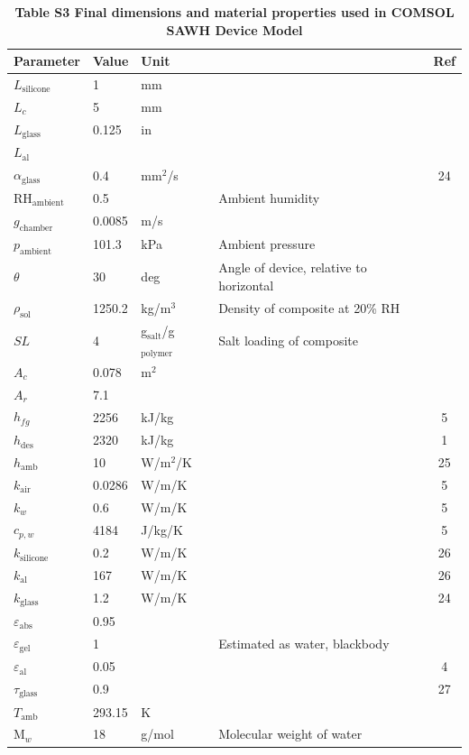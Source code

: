 \documentclass[11pt]{article}
\begin{document}
\begin{table}[!ht]
\centering
\caption*{\textbf{Table S3 Final dimensions and material properties used in COMSOL SAWH Device Model}}
\begin{tabular}{lllp{6cm}c}
\toprule
\textbf{Parameter} & \textbf{Value} & \textbf{Unit} & & \textbf{Ref}\\
\midrule
$L_{\mathrm{silicone}}$ & 1 & mm & & \\
$L_{c}$ & 5 & mm & & \\
$L_{\mathrm{glass}}$ & 0.125 & in & & \\
$L_{\mathrm{al}}$ & & & & \\
$\alpha_{\mathrm{glass}}$ & 0.4 & mm$^{2}$/s & & 24\\
RH$_{\mathrm{ambient}}$ & 0.5 & & Ambient humidity & \\
$g_{\mathrm{chamber}}$ & 0.0085 & m/s & & \\
$p_{\mathrm{ambient}}$ & 101.3 & kPa & Ambient pressure & \\
$\theta$ & 30 & deg & Angle of device, relative to horizontal & \\
$\rho_{\mathrm{sol}}$ & 1250.2 & kg/m$^{3}$ & Density of composite at 20\% RH & \\
$SL$ & 4 & g$_{\mathrm{salt}}$/g$_{\mathrm{polymer}}$ & Salt loading of composite & \\
$A_{c}$ & 0.078 & m$^{2}$ & & \\
$A_{r}$ & 7.1 & & & \\
$h_{fg}$ & 2256 & kJ/kg & & 5\\
$h_{\mathrm{des}}$ & 2320 & kJ/kg & & 1\\
$h_{\mathrm{amb}}$ & 10 & W/m$^{2}$/K & & 25\\
$k_{\mathrm{air}}$ & 0.0286 & W/m/K & & 5\\
$k_{w}$ & 0.6 & W/m/K & & 5\\
$c_{p,w}$ & 4184 & J/kg/K & & 5\\
$k_{\mathrm{silicone}}$ & 0.2 & W/m/K & & 26\\
$k_{\mathrm{al}}$ & 167 & W/m/K & & 26\\
$k_{\mathrm{glass}}$ & 1.2 & W/m/K & & 24\\
$\varepsilon_{\mathrm{abs}}$ & 0.95 & & & \\
$\varepsilon_{\mathrm{gel}}$ & 1 & & Estimated as water, blackbody & \\
$\varepsilon_{\mathrm{al}}$ & 0.05 & & & 4\\
$\tau_{\mathrm{glass}}$ & 0.9 & & & 27\\
$T_{\mathrm{amb}}$ & 293.15 & K & & \\
M$_{w}$ & 18 & g/mol & Molecular weight of water & \\
\bottomrule
\end{tabular}
\end{table}
\end{document}
